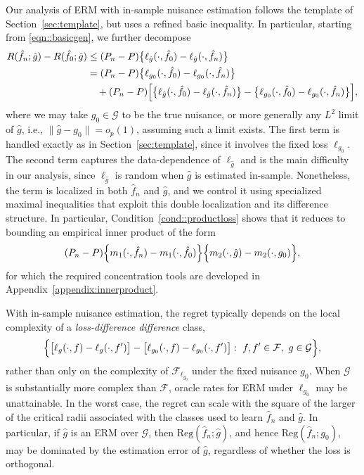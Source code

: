 \documentclass[11pt]{article}
\newcommand{\Reg}{\mathrm{Reg}}
\theoremstyle{plain}
\theoremstyle{definition} %
\begin{document}
Our analysis of ERM with in-sample nuisance estimation follows the template of
Section~\ref{sec:template}, but uses a refined basic inequality. In particular,
starting from \eqref{eqn::basicgen}, we further decompose
\begin{align*}
R(\hat f_n; \hat g)-R(\hat f_0; \hat g)
&\le
(P_n-P)\bigl\{\ell_{\hat g}(\cdot,\hat f_0)-\ell_{\hat g}(\cdot,\hat f_n)\bigr\}\\
&=
(P_n-P)\bigl\{\ell_{g_0}(\cdot,\hat f_0)-\ell_{g_0}(\cdot,\hat f_n)\bigr\}\\
&\quad+
(P_n-P)\Bigl[
\bigl\{\ell_{\hat g}(\cdot,\hat f_0)-\ell_{\hat g}(\cdot,\hat f_n)\bigr\}
-
\bigl\{\ell_{g_0}(\cdot,\hat f_0)-\ell_{g_0}(\cdot,\hat f_n)\bigr\}
\Bigr],
\end{align*}
where we may take $g_0\in\mathcal{G}$ to be the true nuisance, or more generally any $L^2$ limit of $\hat g$, i.e., $\|\hat g-g_0\|=o_p(1)$, assuming such a limit exists.
The first term is handled exactly as in Section~\ref{sec:template}, since it involves the fixed loss \(\ell_{g_0}\). The second term captures the
data-dependence of \(\ell_{\hat g}\) and is the main difficulty in our analysis,
since \(\ell_{\hat g}\) is random when \(\hat g\) is estimated in-sample.
Nonetheless, the term is localized in both \(\hat f_n\) and \(\hat g\), and we
control it using specialized maximal inequalities that exploit this double
localization and its difference structure. In particular,
Condition~\ref{cond::productloss} shows that it reduces to bounding an empirical
inner product of the form
\[
(P_n-P)\Bigl\{m_1(\cdot,\hat f_n)-m_1(\cdot,\hat f_0)\Bigr\}
\Bigl\{m_2(\cdot,\hat g)-m_2(\cdot,g_0)\Bigr\},
\]
for which the required concentration tools are developed in
Appendix~\ref{appendix:innerproduct}.

 
With in-sample nuisance estimation, the regret typically depends on the local
complexity of a \emph{loss-difference difference} class,
\[
\Bigl\{\bigl[\ell_{g}(\cdot,f)-\ell_{g}(\cdot,f')\bigr]
-
\bigl[\ell_{g_0}(\cdot,f)-\ell_{g_0}(\cdot,f')\bigr]
:\ f,f'\in\mathcal{F},\ g\in\mathcal{G}\Bigr\},
\]
rather than only on the complexity of \(\mathcal{F}_{\ell_{g_0}}\) under the fixed nuisance
\(g_0\). When \(\mathcal{G}\) is substantially more complex than \(\mathcal{F}\),
oracle rates for ERM under \(\ell_{g_0}\) may be unattainable. In the worst
case, the regret can scale with the square of the larger of the critical radii
associated with the classes used to learn \(\hat f_n\) and \(\hat g\). In
particular, if \(\hat g\) is an ERM over \(\mathcal{G}\), then
\(\Reg(\hat f_n;\hat g)\), and hence \(\Reg(\hat f_n; g_0)\), may be dominated by the estimation error of \(\hat g\),
regardless of whether the loss is orthogonal.
\end{document}
